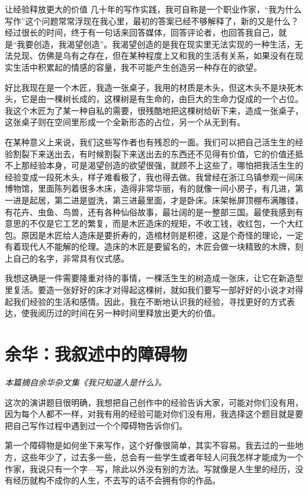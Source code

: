 \documentclass[12pt,a5paper]{ctexbook}
\begin{document}
让经验释放更大的价值
几十年的写作实践，我可自称是一个职业作家，“我为什么写作”这个问题常常浮现在我心里，最初的答案已经不够解释了，新的又是什么？经过很长的时间，终于有一句话来回答媒体，回答评论者，也回答我自己，就是“我要创造，我渴望创造”。我渴望创造的是我在现实里无法实现的一种生活，无法兑现、仿佛是乌有之存在，但在某种程度上又和我的生活有关系，如果没有在现实生活中积累起的情感的容量，我不可能产生创造另一种存在的欲望。

好比我现在是一个木匠，我造一张桌子，我用的材质是木头，但这木头不是块死木头，它是由一棵树长成的，这棵树是有生命的，由巨大的生命力促成的一个占位。我这个木匠为了某一种自私的需要，很残酷地把这棵树给斫下来，造成一张桌子，这张桌子则在空间里形成一个全新形态的占位，另一个从无到有。

在某种意义上来说，我们这些写作者也有残忍的一面。我们可以把自己活生生的经验割裂下来送出去，有时候割裂下来送出去的东西还不见得有价值，它的价值还抵不上那经验本身，可是渴望创造的欲望很强，就顾不上这些了，哪怕把我活生生的经验变成一段死木头，样子难看极了，我也得去做。我曾经在浙江乌镇参观一间床博物馆，里面陈列着很多木床，造得非常华丽，有的就像一间小房子，有几进，第一进是起居，第二进是盥洗，第三进最里面，才是卧床。床架帐屏顶棚布满雕镂，有花卉、虫鱼、鸟兽，还有各种仙俗故事，最壮阔的是一整部三国。最使我感到有意思的不仅是它工艺的繁复，而是木匠造床的规矩，不收工钱，收红包，一个大红包。原因是木匠给人造床是要折寿的，造棺材则是积德，这是个奇怪的理论，一定有着现代人不能解的伦理。造床的木匠是要留名的，木匠会做一块精致的木牌，刻上自己的名字，非常具有仪式感。

我想这确是一件需要隆重对待的事情，一棵活生生的树造成一张床，让它在新造型里复活。要造一张好好的床才对得起这棵树，就如我们要写一部好好的小说才对得起我们经验的生活和感情。因此，我在不断地认识我的经验，寻找更好的方式表达，使我阅历过的时间在另一种时间里释放出更大的价值。


\newpage

\section{余华：我叙述中的障碍物}

\emph{本篇摘自余华杂文集《我只知道人是什么》。}
\vspace{2em}

这次的演讲题目很明确，我想把自己创作中的经验告诉大家，可能对你们没有用，因为每个人都不一样，对我有用的经验可能对你们没有用，我选择这个题目就是要把自己写作过程中遇到过一个个障碍物告诉你们。

第一个障碍物是如何坐下来写作，这个好像很简单，其实不容易。我去过的一些地方，这些年少了，过去多一些，总会有一些学生或者年轻人问我怎样才能成为一个作家，我说只有一个字—写，除此以外没有别的方法。写就像是人生里的经历，没有经历就构不成你的人生，不去写的话不会拥有你的作品。
\end{document}
